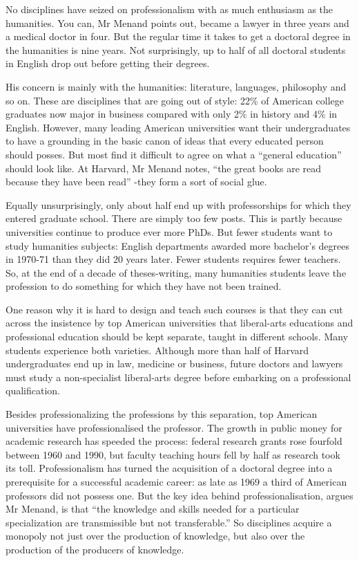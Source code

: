 
\qquad [A] No disciplines have seized on professionalism with as much enthusiasm as the humanities. You can, Mr Menand points out, became a lawyer in three years and a medical doctor in four. But the regular time it takes to get a doctoral degree in the humanities is nine years. Not surprisingly, up to half of all doctoral students in English drop out before getting their degrees.

\qquad [B] His concern is mainly with the humanities: literature, languages, philosophy and so on. These are disciplines that are going out of style: 22\% of American college graduates now major in business compared with only 2\% in history and 4\% in English. However, many leading American universities want their undergraduates to have a grounding in the basic canon of ideas that every educated person should posses. But most find it difficult to agree on what a ``general education'' should look like. At Harvard, Mr Menand notes, ``the great books are read because they have been read'' -they form a sort of social glue. 

\qquad [C] Equally unsurprisingly, only about half end up with professorships for which they entered graduate school. There are simply too few posts. This is partly because universities continue to produce ever more PhDs. But fewer students want to study humanities subjects: English departments awarded more bachelor's degrees in 1970-71 than they did 20 years later. Fewer students requires fewer teachers. So, at the end of a decade of theses-writing, many humanities students leave the profession to do something for which they have not been trained.

\qquad [D] One reason why it is hard to design and teach such courses is that they can cut across the insistence by top American universities that liberal-arts educations and professional education should be kept separate, taught in different schools. Many students experience both varieties. Although more than half of Harvard undergraduates end up in law, medicine or business, future doctors and lawyers must study a non-specialist liberal-arts degree before embarking on a professional qualification.

\qquad [E] Besides professionalizing the professions by this separation, top American universities have professionalised the professor. The growth in public money for academic research has speeded the process: federal research grants rose fourfold between 1960 and 1990, but faculty teaching hours fell by half as research took its toll. Professionalism has turned the acquisition of a doctoral degree into a prerequisite for a successful academic career: as late as 1969 a third of American professors did not possess one. But the key idea behind professionalisation, argues Mr Menand, is that ``the knowledge and skills needed for a particular specialization are transmissible but not transferable.'' So disciplines acquire a monopoly not just over the production of knowledge, but also over the production of the producers of knowledge.


